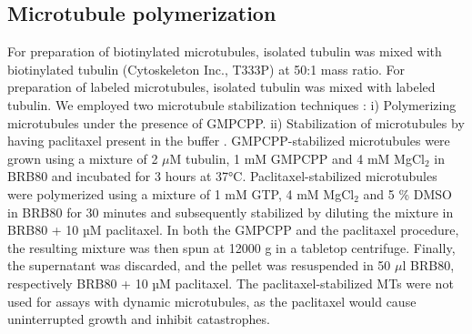 \subsection{Microtubule polymerization}
For preparation of biotinylated microtubules, isolated tubulin was mixed with biotinylated tubulin (Cytoskeleton Inc., T333P) at 50:1 mass ratio. For preparation of labeled microtubules, isolated tubulin was mixed with labeled tubulin. We employed two microtubule stabilization techniques : i) Polymerizing microtubules under the presence of GMPCPP. ii) Stabilization of microtubules by having paclitaxel present in the buffer \parencite{SCHIFF1979}. GMPCPP-stabilized microtubules were grown using a mixture of 2 $\mu$M tubulin, 1 mM GMPCPP and 4 mM MgCl$_2$ in BRB80 and incubated for 3 hours at 37°C. Paclitaxel-stabilized microtubules were polymerized using a mixture of 1 mM GTP, 4 mM MgCl$_2$ and 5 \% DMSO in BRB80 for 30 minutes and subsequently stabilized by diluting the mixture in BRB80 + 10 µM paclitaxel. In both the GMPCPP and the paclitaxel procedure, the resulting mixture was then spun at 12000 g in a tabletop centrifuge. Finally, the supernatant was discarded, and the pellet was resuspended in 50 $\mu$l BRB80, respectively BRB80 + 10 µM paclitaxel. The paclitaxel-stabilized MTs were not used for assays with dynamic microtubules, as the paclitaxel would cause uninterrupted growth and inhibit catastrophes.

